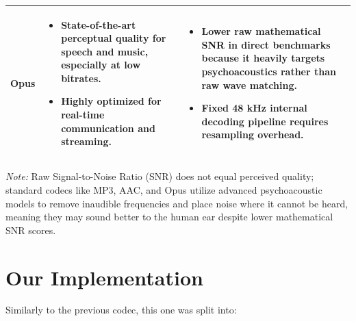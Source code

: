 \begin{table}[htbp]
\begin{tabularx}{\textwidth}{
        @{}
        >{\raggedright\arraybackslash}p{}
        >{\raggedright\arraybackslash}X
        >{\raggedright\arraybackslash}X
        @{}
    }
        \addlinespace
        \midrule

        \textbf{Opus}
        &
        \begin{itemize}[leftmargin=*, nosep]
            \item State-of-the-art perceptual quality for speech and music, especially at low bitrates.
            \item Highly optimized for real-time communication and streaming.
        \end{itemize}
        &
        \begin{itemize}[leftmargin=*, nosep]
            \item Lower raw mathematical SNR in direct benchmarks because it heavily targets psychoacoustics rather than raw wave matching.
            \item Fixed 48 kHz internal decoding pipeline requires resampling overhead.
        \end{itemize}
        \\
        
        \bottomrule
    \end{tabularx}

    \vspace{2mm}
    \small
    \noindent\textit{Note:} Raw Signal-to-Noise Ratio (SNR) does not equal perceived quality; standard codecs like MP3, AAC, and Opus utilize advanced psychoacoustic models to remove inaudible frequencies and place noise where it cannot be heard, meaning they may sound better to the human ear despite lower mathematical SNR scores.
\end{table}

\vspace{10pt}
\section{Our Implementation}

Similarly to the previous codec, this one was split into:

